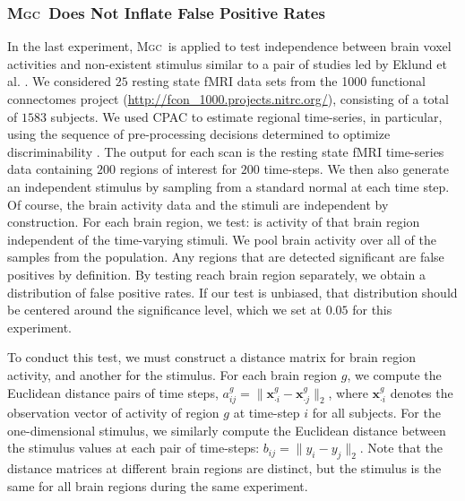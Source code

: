 \documentclass[11pt]{article}
\providecommand{\sct}[1]{{\normalfont\textsc{#1}}}
\providecommand{\mb}[1]{\boldsymbol{#1}}
\newcommand{\Mgc}{\sct{Mgc}}
\begin{document}
\subsubsection*{\Mgc~Does Not Inflate False Positive Rates} %

In the last experiment, \Mgc~is applied to test independence between brain voxel activities and non-existent stimulus similar to a pair of studies led by Eklund et al. \cite{EklundKnutsson2012,Eklund2015}. We considered $25$ resting state fMRI data sets from the 1000 functional connectomes project (\url{http://fcon_1000.projects.nitrc.org/}), consisting of a total of $1583$ subjects.
We used CPAC \cite{CPAC2015} to estimate regional time-series, in particular, using the sequence of pre-processing decisions determined to optimize discriminability \cite{Wang2016}.  The output for each scan is the resting state fMRI time-series data containing $200$ regions of interest for $200$ time-steps.
We then also generate an independent stimulus  by sampling from a standard normal at each time step.  Of course, the brain activity data and the stimuli are independent by construction.
For each brain region, we test: is activity of that  brain region independent of the time-varying stimuli. We pool brain activity over all of the samples from the population.
Any regions that are detected significant are false positives by definition.  By testing reach brain region separately, we obtain a distribution of false positive rates.  If our test is unbiased, that distribution should be centered around the significance level, which we set at $0.05$ for this experiment.

To conduct this test, we must construct a distance matrix for brain region activity, and another for the stimulus. For each brain region $g$, we compute the Euclidean distance pairs of time steps,  $a_{ij}^g=\|\mb{x}_{\cdot i}^g-\mb{x}_{\cdot j}^g\|_2$,  where $\mb{x}_{\cdot i}^g$ denotes the observation vector of activity of region $g$ at time-step $i$ for all subjects.
For the one-dimensional stimulus, we similarly compute the Euclidean distance between the stimulus values at each pair of time-steps: $b_{ij}= \|y_i - y_j\|_2$.
Note that the distance matrices at different brain regions are distinct, but the stimulus is the same for all brain regions during the same experiment.
\end{document}
